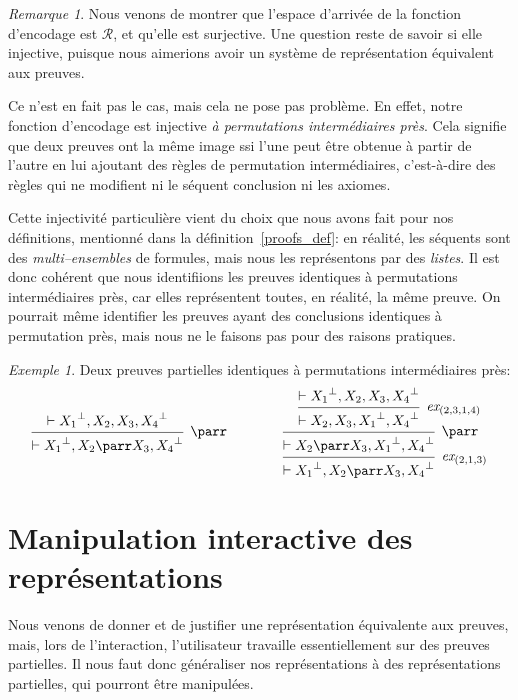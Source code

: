 \documentclass[11pt,a4paper]{article}
\theoremstyle{plain}
\theoremstyle{definition}
\theoremstyle{remark}
\newtheorem{remark}{Remarque}
\newtheorem{example}{Exemple}
\newcommand*{\orth}{^\perp}
\newcommand*{\hypv}[1]{\hypo{\vdash #1}}
\newcommand*{\parrv}[1]{\infer{1}[\ensuremath{\parr}]{\vdash #1}}
\newcommand*{\permv}[2]{\infer{1}[\ensuremath{\textit{ex}_{#1}}]{\vdash #2}}
\newcommand*{\representations}{\ensuremath{\mathcal{R}}}
\begin{document}
\begin{remark}
    \label{remark_kernel}
    Nous venons de montrer que l'espace d'arrivée de la fonction d'encodage est $\representations$, et qu'elle est surjective. Une question reste de savoir si elle injective, puisque nous aimerions avoir un système de représentation équivalent aux preuves.

    Ce n'est en fait pas le cas, mais cela ne pose pas problème. En effet, notre fonction d'encodage est injective \textit{à permutations intermédiaires près}. Cela signifie que deux preuves ont la même image ssi l'une peut être obtenue à partir de l'autre en lui ajoutant des règles de permutation intermédiaires, c'est-à-dire des règles qui ne modifient ni le séquent conclusion ni les axiomes.

    Cette injectivité particulière vient du choix que nous avons fait pour nos définitions, mentionné dans la définition~\ref{proofs_def}: en réalité, les séquents sont des \textit{multi--ensembles} de formules, mais nous les représentons par des \textit{listes}. Il est donc cohérent que nous identifiions les preuves identiques à permutations intermédiaires près, car elles représentent toutes, en réalité, la même preuve. On pourrait même identifier les preuves ayant des conclusions identiques à permutation près, mais nous ne le faisons pas pour des raisons pratiques.

    \begin{example}Deux preuves partielles identiques à permutations intermédiaires près:
        \begin{equation*}
            \begin{prooftree}
               \hypv{{X_1}\orth, X_2, X_3, {X_4}\orth}
               \parrv{{X_1}\orth, X_2 \parr X_3, {X_4}\orth}
            \end{prooftree}
\qquad\qquad
             \begin{prooftree}
               \hypv{{X_1}\orth, X_2, X_3, {X_4}\orth}
               \permv{(2, 3, 1, 4)}{X_2, X_3, {X_1}\orth, {X_4}\orth}
               \parrv{X_2 \parr X_3, {X_1}\orth, {X_4}\orth}
               \permv{(2, 1, 3)}{{X_1}\orth, X_2 \parr X_3, {X_4}\orth}
            \end{prooftree}
        \end{equation*}
    \end{example}
\end{remark}


\section{Manipulation interactive des représentations}
Nous venons de donner et de justifier une représentation équivalente aux preuves, mais, lors de l'interaction, l'utilisateur travaille essentiellement sur des preuves partielles. Il nous faut donc généraliser nos représentations à des représentations partielles, qui pourront être manipulées.
\end{document}
